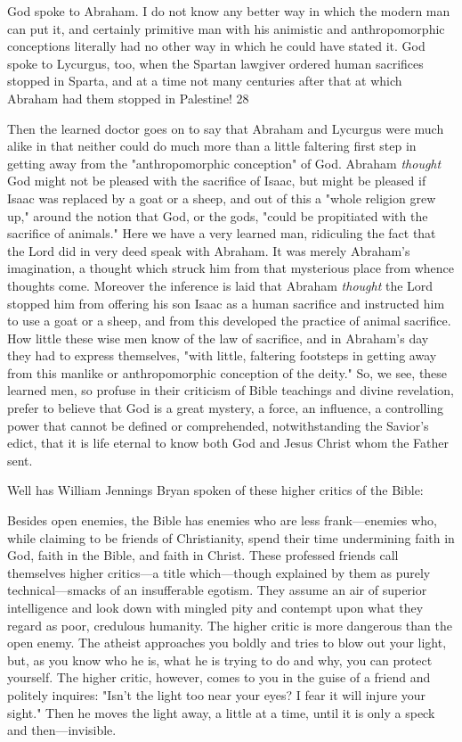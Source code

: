 God spoke to Abraham. I do not know any better way in which the modern man can put it,
and certainly primitive man with his animistic and anthropomorphic conceptions literally had
no other way in which he could have stated it. God spoke to Lycurgus, too, when the Spartan
lawgiver ordered human sacrifices stopped in Sparta, and at a time not many centuries after
that at which Abraham had them stopped in Palestine! 28

Then the learned doctor goes on to say that Abraham and Lycurgus were much alike in that
neither could do much more than a little faltering first step in getting away from the
"anthropomorphic conception" of God. Abraham \textit{thought} God might not be pleased with the
sacrifice of Isaac, but might be pleased if Isaac was replaced by a goat or a sheep, and out of
this a "whole religion grew up," around the notion that God, or the gods, "could be
propitiated with the sacrifice of animals." Here we have a very learned man, ridiculing the
fact that the Lord did in very deed speak with Abraham. It was merely Abraham's
imagination, a thought which struck him from that mysterious place from whence thoughts
come. Moreover the inference is laid that Abraham \textit{thought} the Lord stopped him from
offering his son Isaac as a human sacrifice and instructed him to use a goat or a sheep, and
from this developed the practice of animal sacrifice. How little these wise men know of the
law of sacrifice, and in Abraham's day they had to express themselves, "with little, faltering
footsteps in getting away from this manlike or anthropomorphic conception of the deity." So,
we see, these learned men, so profuse in their criticism of Bible teachings and divine
revelation, prefer to believe that God is a great mystery, a force, an influence, a controlling
power that cannot be defined or comprehended, notwithstanding the Savior's edict, that it is
life eternal to know both God and Jesus Christ whom the Father sent.

Well has William Jennings Bryan spoken of these higher critics of the Bible:

Besides open enemies, the Bible has enemies who are less frank—enemies who, while
claiming to be friends of Christianity, spend their time undermining faith in God, faith in the
Bible, and faith in Christ. These professed friends call themselves higher critics—a title
which—though explained by them as purely technical—smacks of an insufferable egotism.
They assume an air of superior intelligence and look down with mingled pity and contempt
upon what they regard as poor, credulous humanity. The higher critic is more dangerous than
the open enemy. The atheist approaches you boldly and tries to blow out your light, but, as
you know who he is, what he is trying to do and why, you can protect yourself. The higher
critic, however, comes to you in the guise of a friend and politely inquires: "Isn't the light too
near your eyes? I fear it will injure your sight." Then he moves the light away, a little at a
time, until it is only a speck and then—invisible.

